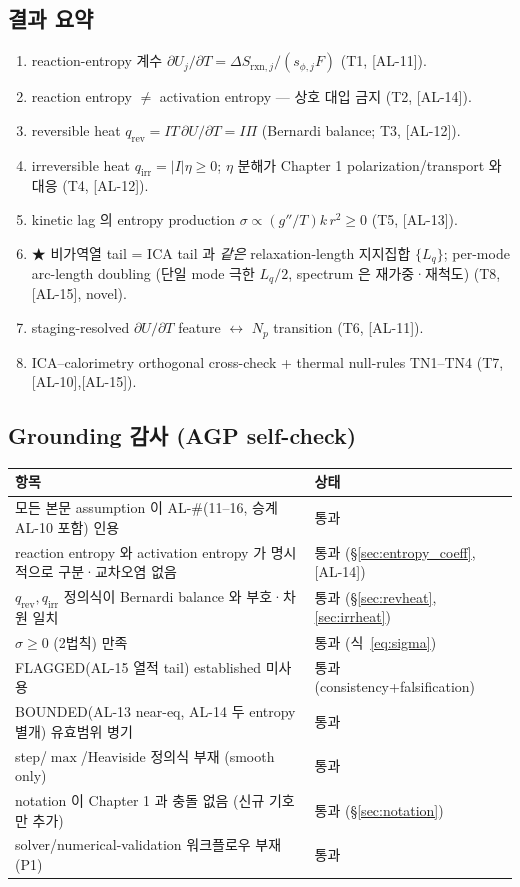 \documentclass[11pt,a4paper]{article}
\newcommand{\rxn}{\mathrm{rxn}}
\newcommand{\rev}{\mathrm{rev}}
\newcommand{\irr}{\mathrm{irr}}
\newcommand{\AL}[1]{\textsf{[AL-#1]}}
\begin{document}
\subsection{결과 요약}
\begin{enumerate}[label=\textbf{(E\arabic*)}]
\item reaction-entropy 계수 $\partial U_j/\partial T=\Delta S_{\rxn,j}/(s_{\phi,j}F)$ (T1, \AL{11}).
\item reaction entropy $\ne$ activation entropy — 상호 대입 금지 (T2, \AL{14}).
\item reversible heat $q_\rev=IT\,\partial U/\partial T=I\Pi$ (Bernardi balance; T3, \AL{12}).
\item irreversible heat $q_\irr=|I|\eta\ge0$; $\eta$ 분해가 Chapter 1 polarization/transport 와 대응 (T4, \AL{12}).
\item kinetic lag 의 entropy production $\sigma\propto (g''/T)k\,r^2\ge0$ (T5, \AL{13}).
\item ★ 비가역열 tail = ICA tail 과 \emph{같은} relaxation-length 지지집합 $\{L_q\}$; per-mode arc-length doubling (단일 mode 극한 $L_q/2$, spectrum 은 재가중·재척도) (T8, \AL{15}, novel).
\item staging-resolved $\partial U/\partial T$ feature $\leftrightarrow$ $N_p$ transition (T6, \AL{11}).
\item ICA--calorimetry orthogonal cross-check + thermal null-rules TN1--TN4 (T7, \AL{10},\AL{15}).
\end{enumerate}

\subsection{Grounding 감사 (AGP self-check)}
\begin{longtable}{p{} p{}}
\toprule 항목 & 상태 \\ \midrule \endhead
모든 본문 assumption 이 AL-\#(11--16, 승계 AL-10 포함) 인용 & 통과 \\
reaction entropy 와 activation entropy 가 명시적으로 구분·교차오염 없음 & 통과 (\S\ref{sec:entropy_coeff}, \AL{14}) \\
$q_\rev,q_\irr$ 정의식이 Bernardi balance 와 부호·차원 일치 & 통과 (\S\ref{sec:revheat},\ref{sec:irrheat}) \\
$\sigma\ge0$ (2법칙) 만족 & 통과 (식~\eqref{eq:sigma}) \\
FLAGGED(AL-15 열적 tail) established 미사용 & 통과 (consistency+falsification) \\
BOUNDED(AL-13 near-eq, AL-14 두 entropy 별개) 유효범위 병기 & 통과 \\
step/$\max$/Heaviside 정의식 부재 (smooth only) & 통과 \\
notation 이 Chapter 1 과 충돌 없음 (신규 기호만 추가) & 통과 (\S\ref{sec:notation}) \\
solver/numerical-validation 워크플로우 부재 (P1) & 통과 \\
\bottomrule
\end{longtable}
\end{document}

